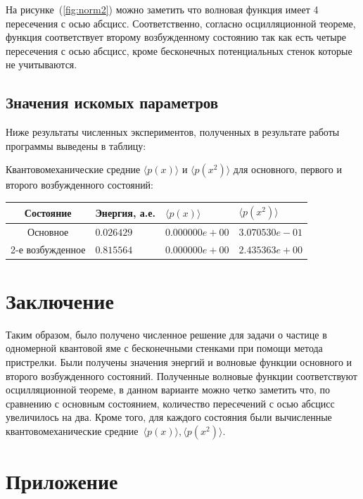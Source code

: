 \documentclass[a4paper,12pt]{article}
\begin{document}
На рисунке~(\ref{fig:norm2}) можно заметить что волновая функция имеет 4 пересечения с осью абсцисс.
Соответственно, согласно осцилляционной теореме, функция соответствует второму возбужденному состоянию так как есть четыре пересечения с осью абсцисс,
кроме бесконечных потенциальных стенок которые не учитываются.

\subsection{Значения искомых параметров}\label{subsec:results_values}

Ниже результаты численных экспериментов, полученных в результате работы программы выведены в таблицу:

Квантовомеханические средние $\langle p(x) \rangle$ и $\langle p(x^2) \rangle$ для основного, первого и второго возбужденного состояний:


\noindent
\begin{tabularx}{\linewidth}{|c|X|X|X|}
    \hline
    \textbf{Состояние}&\textbf{Энергия, а.е.}&\textbf{$\langle p(x) \rangle$}&\textbf{$\langle p(x^2) \rangle$} \\
    \hline
    Основное & $0.026429$ & $0.000000e+00$ & $3.070530e-01$\\
    \hline
    2-е возбужденное & $0.815564$ & $0.000000e+00$ & $2.435363e+00$\\
    \hline
\end{tabularx}

\newpage

\section{Заключение}\label{sec:zakl}

Таким образом, было получено численное решение для задачи о частице в одномерной квантовой яме с бесконечными стенками при помощи метода пристрелки.
Были получены значения энергий и волновые функции основного и второго возбужденного состояний.
Полученные волновые функции соответствуют осцилляционной теореме,
в данном варианте можно четко заметить что, по сравнению с основным состоянием, количество пересечений с осью абсцисс увеличилось на два.
Кроме того, для каждого состояния были вычисленные квантовомеханические средние~$\langle p(x) \rangle, \langle p(x^2) \rangle$.

\newpage

\appendix

\section*{Приложение}\label{sec:extras}

\end{document}
